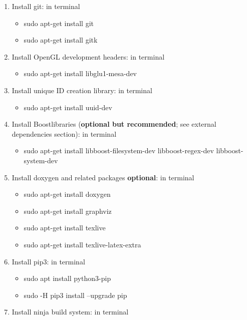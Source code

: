 \begin{enumerate}
\def\labelenumi{\arabic{enumi}.}
\item
  Install git: in terminal

  \begin{itemize}
  \item
    sudo apt-get install git
  \item
    sudo apt-get install gitk
  \end{itemize}
\item
  Install OpenGL development headers: in terminal

  \begin{itemize}
  \tightlist
  \item
    sudo apt-get install libglu1-mesa-dev
  \end{itemize}
\item
  Install unique ID creation library: in terminal

  \begin{itemize}
  \tightlist
  \item
    sudo apt-get install uuid-dev
  \end{itemize}
\item
  Install Boostlibraries (\textbf{optional but recommended}; see
  external dependencies section): in terminal

  \begin{itemize}
  \tightlist
  \item
    sudo apt-get install libboost-filesystem-dev libboost-regex-dev
    libboost-system-dev
  \end{itemize}
\item
  Install doxygen and related packages \textbf{optional}: in terminal

  \begin{itemize}
  \item
    sudo apt-get install doxygen
  \item
    sudo apt-get install graphviz
  \item
    sudo apt-get install texlive
  \item
    sudo apt-get install texlive-latex-extra
  \end{itemize}
\item
  Install pip3: in terminal

  \begin{itemize}
  \item
    sudo apt install python3-pip
  \item
    sudo -H pip3 install --upgrade pip
  \end{itemize}
\item
  Install ninja build system: in terminal


\end{enumerate}
